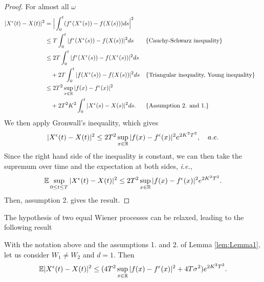 \begin{proof}
For almost all $\omega$
\begin{equation*}
\begin{aligned}
	|X^\epsilon(t) - X(t)|^2  &= \Big|\int_0^t (f^\epsilon (X^\epsilon(s)) - f(X(s)))ds \Big|^2 \\
	&\leq T \int_0^t |f^\epsilon (X^\epsilon(s)) - f(X(s))|^2 ds   && \{\text{Cauchy-Schwarz inequality}\}\\
	&\leq 2T \int_0^t |f^\epsilon (X^\epsilon(s)) - f(X^\epsilon(s))|^2 ds \\
	&\quad + 2T \int_0^t |f (X^\epsilon(s)) - f(X(s))|^2 ds && \{\text{Triangular inequality, Young inequality}\} \\
	&\leq 2T^2 \sup_{x\in \mathbb{R}}|f(x) - f^\epsilon(x)|^2 \\
	&\quad + 2T^2K^2 \int_0^t |X^\epsilon(s) - X(s)|^2ds. && \{\text{Assumption 2. and 1.}\} 
\end{aligned} 
\end{equation*}
We then apply Gronwall's inequality, which gives 
\begin{equation}\label{eq:TheoryEpsilon}
	|X^\epsilon(t) - X(t)|^2 \leq  2T^2 \sup_{x\in \mathbb{R}}|f(x) - f^\epsilon(x)|^2 e^{2K^2T^2}, \quad a.e.
\end{equation}
Since the right hand side of the inequality is constant, we can then take the supremum over time and the expectation at both sides, \textit{i.e.},
\begin{equation*}
	\mathbb{E} \sup_{0 \leq t \leq T} |X^\epsilon(t) - X(t)|^2 \leq  2T^2 \sup_{x\in \mathbb{R}}|f(x) - f^\epsilon(x)|^2 e^{2K^2T^2}.
\end{equation*}
Then, assumption 2. gives the result.
\end{proof}
\noindent The hypothesis of two equal Wiener processes can be relaxed, leading to the following result

\begin{lemma}\label{lem:Lemma2} With the notation above and the assumptions 1. and 2. of Lemma \ref{lem:Lemma1}, let us consider $W_1 \neq W_2$ and $d = 1$. Then
\begin{equation*}	
	\mathbb{E} |X^\epsilon(t) - X(t)|^2 \leq (4T^2 \sup_{x\in \mathbb{R}}|f(x) - f^\epsilon(x)|^2 + 4T\sigma^2) e^{2K^2T^2}.
\end{equation*}
\end{lemma}


